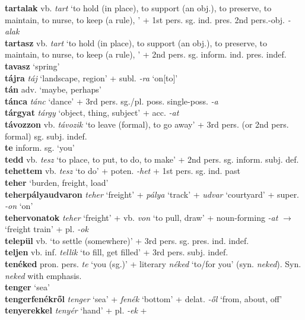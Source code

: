 \documentclass[11pt]{article}
\begin{document}
\textbf{tartalak} vb. \emph{tart} `to hold (in place), to support (an
obj.), to preserve, to maintain, to nurse, to keep (a rule), ' + 1st
pers. sg. ind. pres. 2nd pers.\hyp{}obj. \emph{-alak} \\
\textbf{tartasz} vb. \emph{tart} `to hold (in place), to support (an
obj.), to preserve, to maintain, to nurse, to keep (a rule), ' + 2nd
pers. sg. inform. ind. pres. indef. \\
\textbf{tavasz} `spring' \\
\textbf{tájra} \emph{táj} `landscape, region' + subl. \emph{-ra}
`on[to]' \\
\textbf{tán} adv. `maybe, perhaps' \\
\textbf{tánca} \emph{tánc} `dance' + 3rd
pers. sg./pl. poss. single\hyp{}poss. \emph{-a} \\
\textbf{tárgyat} \emph{tárgy} `object, thing, subject' +
acc. \emph{-at} \\
\textbf{távozzon} vb. \emph{távozik} `to leave (formal), to go away' + 3rd
pers. (or 2nd pers. formal) sg. subj. indef. \\
\textbf{te} inform. sg. `you' \\
\textbf{tedd} vb. \emph{tesz} `to place, to put, to do, to make' + 2nd
pers. sg. inform. subj. def. \\
\textbf{tehettem} vb. \emph{tesz} `to do' + poten. \emph{-het} + 1st
pers. sg. ind. past \\
\textbf{teher} `burden, freight, load'\\
\textbf{teherpályaudvaron} \emph{teher} `freight' + \emph{pálya}
  `track' + \emph{udvar} `courtyard' + super. \emph{-on} `on' \\
\textbf{tehervonatok} \emph{teher} `freight' + vb. \emph{von} `to
pull, draw' + noun\hyp{}forming \emph{-at} $\rightarrow$ `freight train' +
pl. \emph{-ok} \\
\textbf{települ} vb. `to settle (somewhere)' + 3rd
pers. sg. pres. ind. indef. \\
\textbf{teljen} vb. inf. \emph{tellik} `to fill, get filled' + 3rd
pers. subj. indef. \\
\textbf{tenéked} pron. pers. \emph{te} `you (sg.)' + literary \emph{néked}
`to/for you' (syn. \emph{neked}). Syn. \emph{neked} with emphasis. \\
\textbf{tenger} `sea' \\
\textbf{tengerfenékről} \emph{tenger} `sea' + \emph{fenék} `bottom' +
delat. \emph{-ől} `from, about, off' \\
\textbf{tenyerekkel} \emph{tenyér} `hand' + pl. \emph{-ek} +
\end{document}
